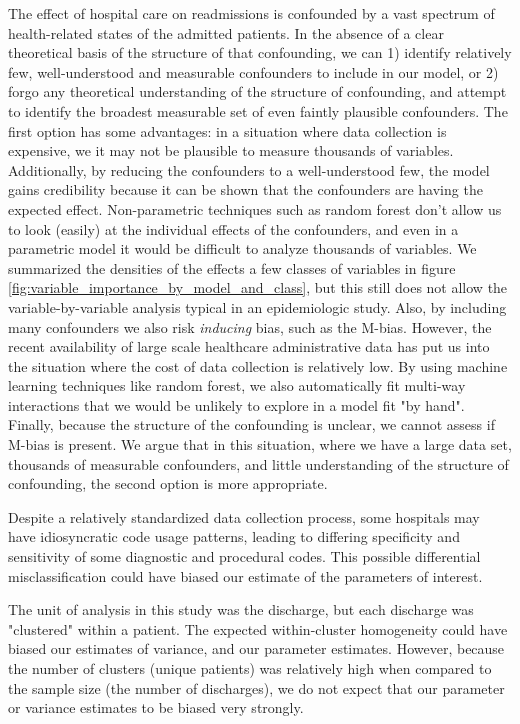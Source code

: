 \documentclass[]{article}\usepackage[]{graphicx}\usepackage[]{color}
\begin{document}
The effect of hospital care on readmissions is confounded by a vast spectrum of health-related states of the admitted patients. In the absence of a clear theoretical basis of the structure of that confounding, we can 1) identify relatively few, well-understood and measurable confounders to include in our model, or 2) forgo any theoretical understanding of the structure of confounding, and attempt to identify the broadest measurable set of even faintly plausible confounders. The first option has some advantages: in a situation where data collection is expensive, we it may not be plausible to measure thousands of variables. Additionally, by reducing the confounders to a well-understood few, the model gains credibility because it can be shown that the confounders are having the expected effect. Non-parametric techniques such as random forest don't allow us to look (easily) at the individual effects of the confounders, and even in a parametric model it would be difficult to analyze thousands of variables. We summarized the densities of the effects a few classes of variables in figure \ref{fig:variable_importance_by_model_and_class}, but this still does not allow the variable-by-variable analysis typical in an epidemiologic study. Also, by including many confounders we also risk \emph{inducing} bias, such as the M-bias. However, the recent availability of large scale healthcare administrative data has put us into the situation where the cost of data collection is relatively low. By using machine learning techniques like random forest, we also automatically fit multi-way interactions that we would be unlikely to explore in a model fit "by hand". Finally, because the structure of the confounding is unclear, we cannot assess if M-bias is present. We argue that in this situation, where we have a large data set, thousands of measurable confounders, and little understanding of the structure of confounding, the second option is more appropriate.

Despite a relatively standardized data collection process, some hospitals may have idiosyncratic code usage patterns, leading to differing specificity and sensitivity of some diagnostic and procedural codes. This possible differential misclassification could have biased our estimate of the parameters of interest.

The unit of analysis in this study was the discharge, but each discharge was "clustered" within a patient. The expected within-cluster homogeneity could have biased our estimates of variance, and our parameter estimates. However, because the number of clusters (unique patients) was relatively high when compared to the sample size (the number of discharges), we do not expect that our parameter or variance estimates to be biased very strongly.
\end{document}
